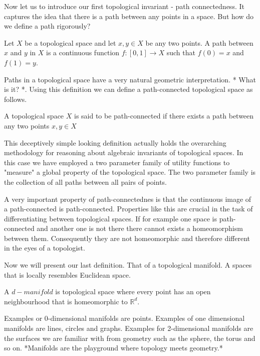 Now let us to introduce our first topological invariant - path connectedness. It captures the idea that there is a path between any points in a space. But how do we define a path rigorously?

\begin{defn} Let $X$ be a topological space and let $x, y \in X$ be any two points. A path between $x$ and $y$ in $X$ is a continuous function $f: [0, 1] \to X$ such that $f(0) = x$ and $f(1) = y$.  \end{defn}


Paths in a topological space have a very natural geometric interpretation. * What is it? *. Using this definition we can define a path-connected topological space as follows.

\begin{defn} A topological space $X$ is said to be path-connected if there exists a path between any two points $x, y \in X$  \end{defn}

This deceptively simple looking definition actually holds the overarching methodology for reasoning about algebraic invariants of topological spaces. In this case we have employed a two parameter family of utility functions to "measure" a global property of the topological space. The two parameter family is the collection of all paths between all pairs of points.

A very important property of path-connectednes is that the continuous image of a path-connected is path-connected. Properties like this are crucial in the task of differentiating between topological spaces. If for example one space is path-connected and another one is not there there cannot exists a homeomorphism between them. Consequently they are not homeomorphic and therefore different in the eyes of a topologist.

Now we will present our last definition. That of a topological manifold. A spaces that is locally resembles Euclidean space.


\begin{defn} A $d-manifold$ is topological space where every point has an open neighbourhood that is homeomorphic to $\mathbb{R}^d$.  \end{defn}

Examples or 0-dimensional manifolds are points. Examples of one dimensional manifolds are lines, circles and graphs. Examples for 2-dimensional manifolds are the surfaces we are familiar with from geometry such as the sphere, the torus and so on. *Manifolds are the playground where topology meets geometry.* 

